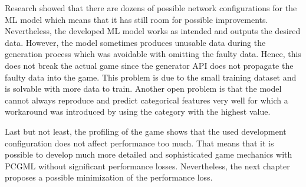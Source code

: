 \documentclass[MGS,Master,english]{twbook}%
\begin{document}
Research showed that there are dozens of possible network configurations for the ML model which means that it has still room for possible improvements. Nevertheless, the developed ML model works as intended and outputs the desired data. However, the model sometimes produces unusable data during the generation process which was avoidable with omitting the faulty data. Hence, this does not break the actual game since the generator API does not propagate the faulty data into the game. This problem is due to the small training dataset and is solvable with more data to train. Another open problem is that the model cannot always reproduce and predict categorical features very well for which a workaround was introduced by using the category with the highest value.

Last but not least, the profiling of the game shows that the used development configuration does not affect performance too much. That means that it is possible to develop much more detailed and sophisticated game mechanics with PCGML without significant performance losses. Nevertheless, the next chapter proposes a possible minimization of the performance loss.
\end{document}
